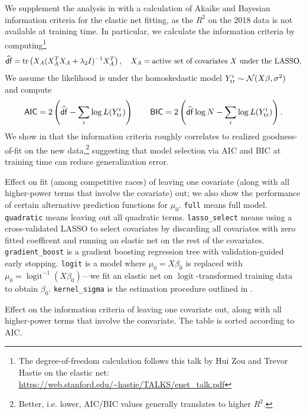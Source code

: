 \documentclass[12pt]{article}
\newcommand{\logit}{\operatorname{logit}}
\begin{document}
We supplement the analysis in  with a calculation of Akaike and Bayesian information criteria for the elastic net fitting, as the $R^2$ on the 2018 data is not available at training time. In particular, we calculate the information criteria by computing\footnote{The degree-of-freedom calculation follows this talk by Hui Zou and Trevor Hastie on the elastic net: \url{https://web.stanford.edu/~hastie/TALKS/enet_talk.pdf}} \[
\widehat {\mathsf{df}} = \operatorname{tr}\left({X_A (X_A^T X_A + \lambda_2 I)^{-1} X_A^T}\right), \quad X_A = \text{active set of covariates $X$ under the LASSO},
\] 
We assume the likelihood is under the homoskedastic model $Y^i_{\text{tr}} \sim \mathcal{N}(X\beta, \sigma^2)$ and compute \begin{align*}
\mathsf{AIC} = 2 \left({\widehat {\mathsf{df}} - \sum_i \log 
L(Y_\text{tr}^i)}\right) \qquad \mathsf{BIC} = 2 \left({\widehat {\mathsf{df}} \log N - \sum_i \log 
L(Y_\text{tr}^i) }\right).
\end{align*}
We show in  that the information criteria roughly correlates to realized goodness-of-fit on the new data,\footnote{Better, i.e. lower, AIC/BIC values generally translates to higher $R^2$.} suggesting that model selection via AIC and BIC at training time can reduce generalization error. 

\begin{table}[tb]
  \caption{Effect on fit (among competitive races) of leaving one covariate (along with all higher-power terms that involve the covariate) out; we also show the performance of certain alternative prediction functions for $\mu_0$. \texttt{full} means full model. \texttt{quadratic} means leaving out all quadratic terms. \texttt{lasso\_select} means using a cross-validated LASSO to select covariates by discarding all covariates with zero fitted coefficent and running an elastic net on the rest of the covariates. \texttt{gradient\_boost} is a gradient boosting regression tree with validation-guided early stopping. \texttt{logit} is a model where $\mu_0 = X\beta_0$ is replaced with $\mu_0 = \logit^{-1}(X\beta_0)$---we fit an elastic net on $\logit$-transformed training data to obtain $\beta_0$. \texttt{kernel\_sigma} is the estimation procedure outlined in .}
  \label{tab:leave_out}
  \centering
  \vspace{.4em}
  
\end{table}

\begin{table}[tb]
  \caption{Effect on the information criteria of leaving one covariate out, along with all higher-power terms that involve the convariate. The table is sorted according to AIC.}
  \label{tab:ic}
  \centering
  \vspace{.4em}
  
\end{table}
\end{document}

